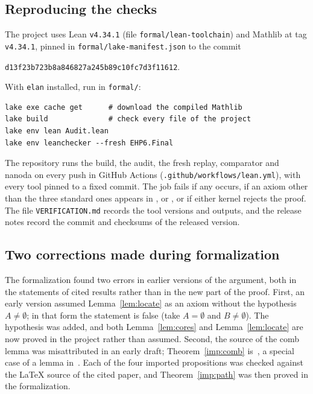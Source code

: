\subsection{Reproducing the checks}
The project uses Lean \texttt{v4.34.1} (file \texttt{formal/lean-toolchain}) and Mathlib at tag
\texttt{v4.34.1}, pinned in \texttt{formal/lake-manifest.json} to the commit
\begin{center}\texttt{d13f23b723b8a846827a245b89c10fc7d3f11612}.\end{center}
With \texttt{elan} installed, run in \texttt{formal/}:
\begin{lstlisting}
lake exe cache get      # download the compiled Mathlib
lake build              # check every file of the project
lake env lean Audit.lean
lake env leanchecker --fresh EHP6.Final
\end{lstlisting}
The repository runs the build, the audit, the fresh replay, comparator and nanoda on every push in GitHub Actions
(\texttt{.github/workflows/lean.yml}), with every tool pinned to a fixed commit. The job fails if any
 occurs, if an axiom other than the three standard ones appears in
,  or
, or if either kernel rejects the proof. The file
\texttt{VERIFICATION.md} records the tool versions and outputs, and the release notes record the commit
and checksums of the released version.

\subsection{Two corrections made during formalization}
The formalization found two errors in earlier versions of the argument, both in the statements of
cited results rather than in the new part of the proof. First, an early version assumed
Lemma~\ref{lem:locate} as an axiom without the hypothesis $A\ne\emptyset$; in that form the statement is
false (take $A=\emptyset$ and $B\ne\emptyset$). The hypothesis was added, and both Lemma~\ref{lem:cores} and
Lemma~\ref{lem:locate} are now proved in the project rather than assumed. Second, the source of the comb
lemma was misattributed in an early draft; Theorem~\ref{imp:comb} is~\cite[Lemma 4.3]{NSS7}, a special
case of a lemma in~\cite{C5}. Each of the four imported propositions was checked against the \LaTeX{}
source of the cited paper, and Theorem~\ref{imp:path} was then proved in the formalization.
